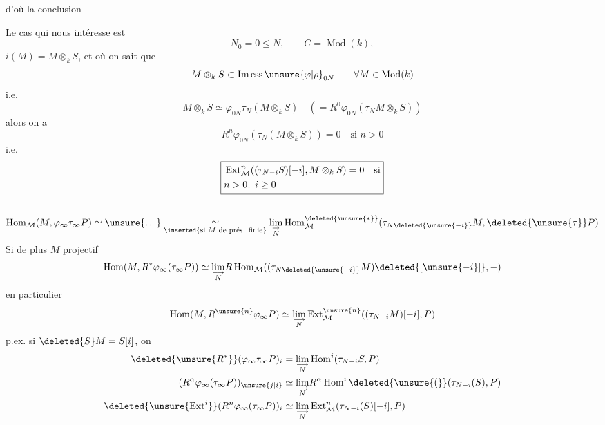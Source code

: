 d'où la conclusion

Le cas qui nous intéresse est
\[
N_0=0\leq N,\qquad C=\operatorname{Mod}(k),
\]
$i(M)=M\otimes_k S$, et où on sait que
\[
M\otimes_k S\subset\operatorname{Im\,ess}\unsure{\varphi|\rho}_{0N}\qquad\forall M\in\operatorname{Mod}(k)
\]
i.e.
\[
M\otimes_k S\simeq\varphi_{0N}\tau_N(M\otimes_k S)\quad(=R^0\varphi_{0N}(\tau_N M\otimes_k S))
\]
\deleted{\[
\begin{gathered}
\rotatebox{90}{$=$}\\
\operatorname{Hom}((\tau_{N-i}S)[-i],M\otimes_{\unsure{k|r}}
\end{gathered}
\]}
alors on a
\[
R^n\varphi_{0N}(\tau_N(M\otimes_k S))=0\quad\text{si }n>0
\]
i.e.
\[
\boxed{\begin{aligned}
&\operatorname{Ext}_{\mathcal M}^n((\tau_{N-i}S)[-i],M\otimes_k S)=0\quad\text{si}\\
&\hfill n>0,\ i\geq 0
\end{aligned}}
\]

\noindent\rule{.98\linewidth}{.3pt}\par
\[
\operatorname{Hom}_{\mathcal M}(M,\varphi_\infty\tau_\infty P)\simeq\unsure{\ldots}\underset{\inserted{\text{si }M\text{ de prés. finie}}}{\simeq}
\underset{\substack{\rightarrow\\N}}{\lim}\operatorname{Hom}_{\mathcal M}^{\deleted{\unsure{*}}}(\tau_{N\deleted{\unsure{-i}}}M,\deleted{\unsure{\tau}}P)
\]
Si de plus $M$ projectif
\[
\operatorname{Hom}(M,R^*\varphi_\infty(\tau_\infty P))\simeq
\underset{\substack{\longrightarrow\\N}}{\lim}R\operatorname{Hom}_{\mathcal M}((\tau_{N\deleted{\unsure{-i}}}M)\deleted{[\unsure{-i}]},-)
\]
en particulier
\[
\operatorname{Hom}(M,R^{\unsure{n}}\varphi_\infty P)\simeq
\underset{\substack{\longrightarrow\\N}}{\lim}\operatorname{Ext}^{\unsure{n}}_{\mathcal M}((\tau_{N-i}M)[-i],P)
\]
p.ex. si $\deleted{S}M=S[i]$, on 
\[
\begin{aligned}
\deleted{\unsure{R^*}}(\varphi_\infty\tau_\infty P)_i
 &=\underset{\substack{\longrightarrow\\N}}{\lim}\operatorname{Hom}^i(\tau_{N-i}S,P)\\
(R^\alpha\varphi_\infty(\tau_\infty P))_{\unsure{j|i}}
 &\simeq\underset{\substack{\longrightarrow\\N}}{\lim}R^\alpha\operatorname{Hom}^i\deleted{\unsure{(}}(\tau_{N-i}(S),P)\\
\deleted{\unsure{\operatorname{Ext}^i}}(R^n\varphi_\infty(\tau_\infty P))_i
 &\simeq\underset{\substack{\longrightarrow\\N}}{\lim}\operatorname{Ext}_{\mathcal M}^n(\tau_{N-i}(S)[-i],P)
\end{aligned}
\]
